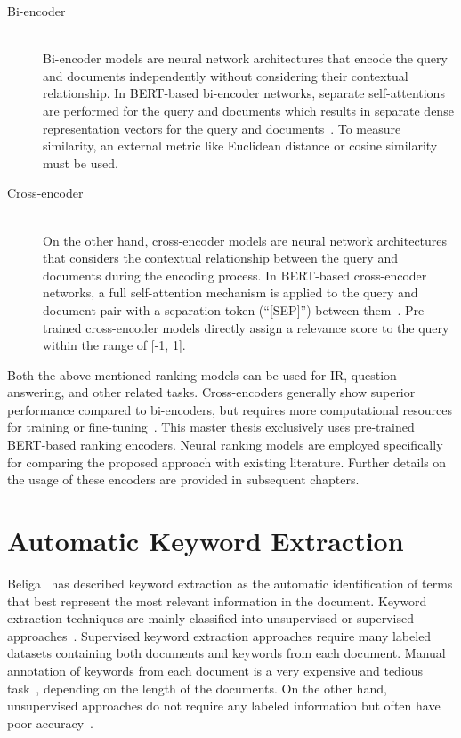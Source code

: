 \begin{description}
	\item[Bi-encoder]  \hfill \\ Bi-encoder models are neural network architectures that encode the query and documents independently without considering their contextual relationship. In BERT-based bi-encoder networks, separate self-attentions are performed for the query and documents which results in separate dense representation vectors for the query and documents~\cite{choi2021improving}. To measure similarity, an external metric like Euclidean distance or cosine similarity must be used.
	 
	\item[Cross-encoder]  \hfill \\ On the other hand, cross-encoder models are neural network architectures that considers the contextual relationship between the query and documents during the encoding process. In BERT-based cross-encoder networks, a full self-attention mechanism is applied to the query and document pair with a separation token (``[SEP]'') between them~\cite{choi2021improving}. Pre-trained cross-encoder models directly assign a relevance score to the query within the range of [-1, 1].
	
\end{description}

Both the above-mentioned ranking models can be used for \ac{IR}, question-answering, and other related tasks. Cross-encoders generally show superior performance compared to bi-encoders, but requires more computational resources for training or fine-tuning~\cite{choi2021improving, jung2022semi}. This master thesis exclusively uses pre-trained BERT-based ranking encoders. Neural ranking models are employed specifically for comparing the proposed approach with existing literature. Further details on the usage of these encoders are provided in subsequent chapters.

\section{Automatic Keyword Extraction}

Beliga~\cite{beliga2014keyword} has described keyword extraction as the automatic identification of terms that best represent the most relevant information in the document. Keyword extraction techniques are mainly classified into unsupervised or supervised approaches~\cite{bennani2018simple}. Supervised keyword extraction approaches require many labeled datasets containing both documents and keywords from each document. Manual annotation of keywords from each document is a very expensive and tedious task~\cite{beliga2014keyword}, depending on the length of the documents. On the other hand, unsupervised approaches do not require any labeled information but often have poor accuracy~\cite{bennani2018simple}.


